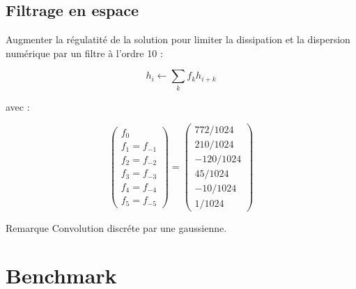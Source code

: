 \documentclass[11pt]{beamer}
\begin{document}
\subsection{Filtrage en espace}
\begin{frame}
Augmenter la régulatité de la solution pour limiter la dissipation et la dispersion numérique par un filtre à l'ordre 10 :

\begin{block}{}
$$h_{i} \leftarrow \sum_{k} f_{k} h_{i+k}$$
\end{block}

avec : 

$$\begin{pmatrix}
f_0 \\ 
f_1 = f_{-1} \\ 
f_2 = f_{-2} \\ 
f_3 = f_{-3} \\ 
f_4 = f_{-4} \\ 
f_5 = f_{-5}
\end{pmatrix} = \begin{pmatrix}
772/1024 \\ 
210/1024 \\ 
-120/1024 \\ 
45/1024 \\ 
-10/1024 \\ 
1/1024
\end{pmatrix} $$

\begin{block}{Remarque}
Convolution discréte par une gaussienne.
\end{block}
\end{frame}

\begin{frame}
\tableofcontents
\end{frame}


\section{Benchmark}
\end{document}

